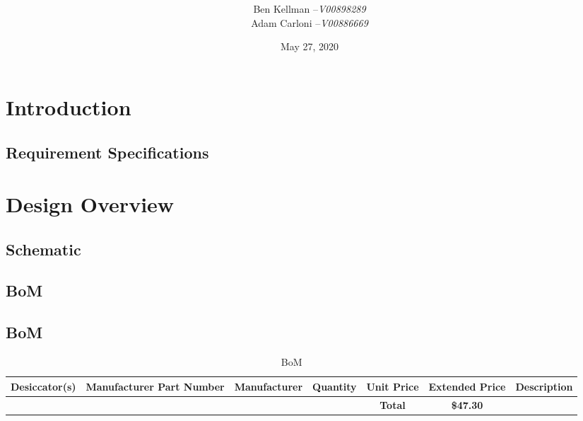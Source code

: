 \documentclass{article}
\title{\bfseries\Huge\sffamily{ECE299 Design Report -- Title\\B03}}
\author{\sffamily Ben Kellman --\textit{V00898289}\\ \sffamily Adam Carloni --\textit{V00886669}}
\date{\sffamily May 27, 2020}
\begin{document}
\begin{titlingpage}
\maketitle
\end{titlingpage}
\tableofcontents
\listoffigures
\listoftables
\newpage

\section{Introduction}
\paragraph{}

\subsection{Requirement Specifications}
\paragraph{}

\section{Design Overview}
\paragraph{}

\subsection{Schematic}
\paragraph{}

\subsection{BoM}
\begin{landscape}
\thispagestyle{empty}

\subsection{BoM}
\begin{table}[h!]
    \centering
    \begin{tabular}{c|c|c|c|c|c|c}
    Desiccator(s)&Manufacturer Part Number&Manufacturer&Quantity&Unit Price&Extended Price&Description\\
    \hline

    \hline
    &&&&\textbf{Total}&\textbf{\$47.30}&
    \end{tabular}
    \caption{BoM}
    \label{tab:bom}
\end{table}

\vfill
\raisebox{5em}{\makebox[\linewidth]{\thepage}}
\end{landscape}
\end{document}
